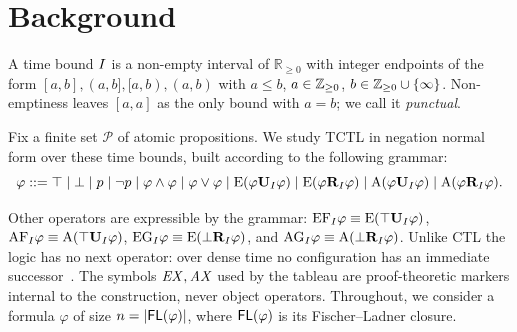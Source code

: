 \section{Background}\label{sec:back}

 
A {time bound} $I$ is a non-empty interval of $\mathbb{R}_{\ge 0}$ with integer endpoints of the form $[a,b],(a,b],[a,b),(a,b)$ with $a\le b$, $a\in\mathbb{Z}_{\ge0}$, $b\in\mathbb{Z}_{\ge0}\cup\{\infty\}$. Non-emptiness leaves $[a,a]$ as the only bound with $a=b$; we call it \emph{punctual}.

Fix a finite set $\mathcal{P}$ of atomic propositions. We study TCTL in negation normal form over these time bounds, built according to the following grammar:
\vspace{-0.1cm}
\[
\varphi ::= \top \mid \bot \mid p \mid \neg p \mid \varphi\land\varphi \mid \varphi\lor\varphi \mid
\mathrm{E}(\varphi\mathbf{U}_I\varphi) \mid \mathrm{E}(\varphi\mathbf{R}_I\varphi) \mid \mathrm{A}(\varphi\mathbf{U}_I\varphi) \mid \mathrm{A}(\varphi\mathbf{R}_I\varphi).
\]

Other operators are expressible by the grammar: $\mathrm{EF}_I \varphi \equiv \mathrm{E}(\top\mathbf{U}_I\varphi)$, $\mathrm{AF}_I \varphi \equiv \mathrm{A}(\top\mathbf{U}_I\varphi)$, $\mathrm{EG}_I \varphi \equiv \mathrm{E}(\bot\mathbf{R}_I\varphi)$, and $\mathrm{AG}_I \varphi \equiv \mathrm{A}(\bot\mathbf{R}_I\varphi)$. 
Unlike CTL the logic has {no next operator}:
over dense time no configuration has an immediate successor~\cite{AlurCourcoubetisDill1990}. The symbols $\EX,\AX$ used by the tableau are proof-theoretic
markers internal to the construction, never object operators. 
Throughout, we consider a formula $\varphi$ of size $n=|\mathsf{FL}(\varphi)|$, where $\mathsf{FL}(\varphi)$ is its Fischer--Ladner closure.

